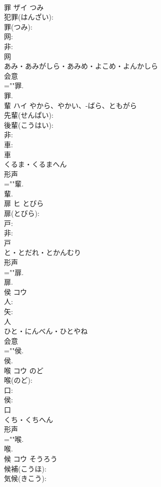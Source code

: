 \documentclass[8pt]{extreport}
\begin{document}
\begin{CJK}{UTF8}{min}
\\	罪	ザイ	つみ		
\\	犯罪(はんざい): 
\\	罪(つみ): 
\\	网: 
\\	非: 
\\	网	
\\	あみ・あみがしら・あみめ・よこめ・よんかしら	
\\	会意 
\\	=""罪.
\\	罪.
\\	輩	ハイ	やから、やかい、-ばら、ともがら		
\\	先輩(せんぱい): 
\\	後輩(こうはい): 
\\	非: 
\\	車: 
\\	車	
\\	くるま・くるまへん	
\\	形声 
\\	=""輩.
\\	輩.
\\	扉	ヒ	とびら		
\\	扉(とびら): 
\\	戸: 
\\	非: 
\\	戸	
\\	と・とだれ・とかんむり	
\\	形声 
\\	=""扉.
\\	扉.
\\	侯	コウ			
\\	人: 
\\	矢: 
\\	人	
\\	ひと・にんべん・ひとやね	
\\	会意 
\\	=""侯.
\\	侯.
\\	喉	コウ	のど		
\\	喉(のど): 
\\	口: 
\\	侯: 
\\	口	
\\	くち・くちへん	
\\	形声 
\\	=""喉.
\\	喉.
\\	候	コウ	そうろう		
\\	候補(こうほ): 
\\	気候(きこう): 

\end{CJK}
\end{document}
